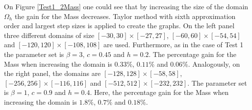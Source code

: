 \documentclass[%
 aip,
cp,  %
 amsmath,amssymb,%
 reprint,%
]{revtex4-2}
\begin{document}
\fi
On Figure \ref{Test1_2Mass} one could see that by increasing the size of the domain $\Omega_h$ the gain for the Mass decreases. Taylor method with sixth approximation order and largest step sizes is applied to create the graphs. On the left panel three different domains of size $[-30, 30] \times [-27, 27]$, $[-60, 60] \times [-54, 54]$ and $[-120, 120] \times [-108, 108]$ are used. Furthermore, as in the case of Test 1 the parameter set is $\beta =  3$, $c = 0.45$ and $h=0.2$. The percentage gain for the Mass when increasing the domain is $0.33\%$, $0.11\%$ and $0.06\%$. Analogously, on the right panel, the domains are $[-128, 128] \times [-58, 58]$, $[-256, 256] \times [-116, 116]$ and $[-512, 512] \times [-232, 232]$. The parameter set is $\beta =  1$, $c = 0.9$ and $h=0.4$. Here, the percentage gain for the Mass when increasing the domain is $1.8\%$, $0.7\%$ and $0.18\%$.
\end{document}
